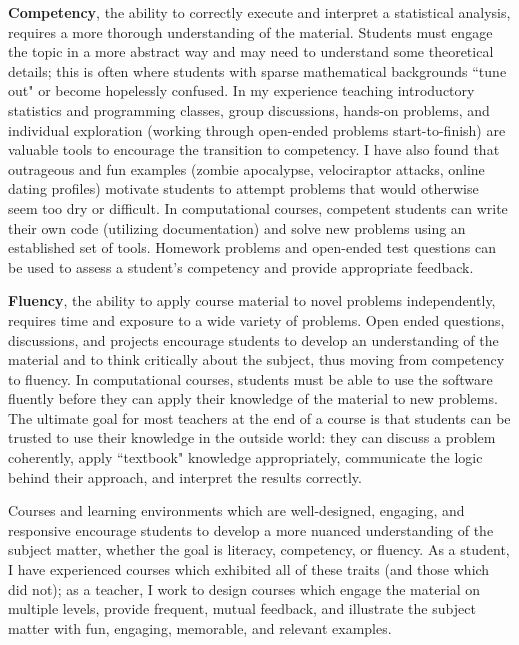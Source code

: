 \documentclass[11pt,letterpaper,sans,unicode]{moderncv}        %
\begin{document}
\textbf{Competency}, the ability to correctly execute and interpret a statistical analysis, requires a more thorough understanding of the material. Students must engage the topic in a more abstract way and may need to understand some theoretical details; this is often where students with sparse mathematical backgrounds ``tune out" or become hopelessly confused. In my experience teaching introductory statistics and programming classes, group discussions, hands-on problems, and individual exploration (working through open-ended problems start-to-finish) are valuable tools to encourage the transition to competency. I have also found that outrageous and fun examples (zombie apocalypse, velociraptor attacks, online dating profiles) motivate students to attempt problems that would otherwise seem too dry or difficult. In computational courses, competent students can write their own code (utilizing documentation) and solve new problems using an established set of tools. Homework problems and open-ended test questions can be used to assess a student's competency and provide appropriate feedback. 

\textbf{Fluency}, the ability to apply course material to novel problems independently, requires time and exposure to a wide variety of problems. Open ended questions, discussions, and projects encourage students to develop an understanding of the material and to think critically about the subject, thus moving from competency to fluency. In computational courses, students must be able to use the software fluently before they can apply their knowledge of the material to new problems. The ultimate goal for most teachers at the end of a course is that students can be trusted to use their knowledge in the outside world: they can discuss a problem coherently, apply ``textbook" knowledge appropriately, communicate the logic behind their approach, and interpret the results correctly. 

\vfill\noindent Courses and learning environments which are well-designed, engaging, and responsive encourage students to develop a more nuanced understanding of the subject matter, whether the goal is literacy, competency, or fluency. As a student, I have experienced courses which exhibited all of these traits (and those which did not); as a teacher, I work to design courses which engage the material on multiple levels, provide frequent, mutual feedback, and illustrate the subject matter with fun, engaging, memorable, and relevant examples. 
\end{document}
